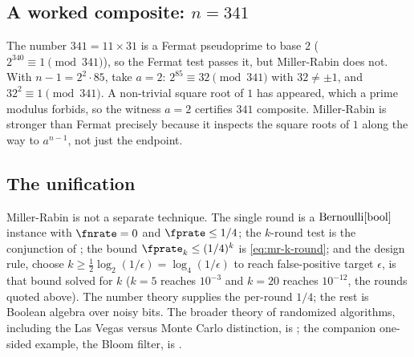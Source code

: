 \subsection*{A worked composite: \texorpdfstring{$n = 341$}{n = 341}}

The number $341 = 11 \times 31$ is a Fermat pseudoprime to base $2$ ($2^{340}
\equiv 1 \pmod{341}$), so the Fermat test passes it, but Miller-Rabin does not.
With $n - 1 = 2^2 \cdot 85$, take $a = 2$: $2^{85} \equiv 32 \pmod{341}$ with
$32 \neq \pm 1$, and $32^2 \equiv 1 \pmod{341}$. A non-trivial square root of
$1$ has appeared, which a prime modulus forbids, so the witness $a = 2$
certifies $341$ composite. Miller-Rabin is stronger than Fermat precisely
because it inspects the square roots of $1$ along the way to $a^{n-1}$, not
just the endpoint.

\subsection*{The unification}

Miller-Rabin is not a separate technique. The single round is a
$\mathrm{Bernoulli}[\mathrm{bool}]$ instance with $\fnrate = 0$ and $\fprate \le 1/4$; the
$k$-round test is the conjunction of ; the bound
$\fprate_k \le (1/4)^k$ is \eqref{eq:mr-k-round}; and the design rule, choose $k
\ge \tfrac{1}{2}\log_2(1/\epsilon) = \log_4(1/\epsilon)$ to reach
false-positive target $\epsilon$, is that bound solved for $k$ ($k = 5$
reaches $10^{-3}$ and $k = 20$ reaches $10^{-12}$, the rounds quoted above). The number theory supplies the per-round $1/4$; the rest
is Boolean algebra over noisy bits. The broader theory of randomized
algorithms, including the Las Vegas versus Monte Carlo distinction, is
; the companion one-sided example, the Bloom
filter, is .
